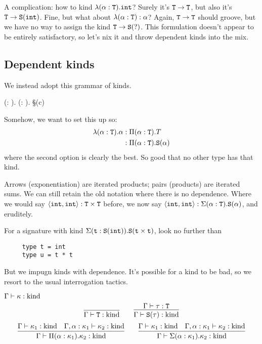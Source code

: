A complication: how to kind $\lambda(\alpha: \T). \int$? Surely it's $\T \to \T$,
but also it's $\T \to \S(\int)$. Fine, but what about $\lambda(\alpha : \T) : \alpha$?
Again, $\T \to \T$ should groove, but we have no way to assign the kind $\T \to \S(?)$.
This formulation doesn't appear to be entirely satisfactory, so let's nix it and throw
dependent kinds into the mix.

\subsection{Dependent kinds}
We instead adopt this grammar of kinds.
\begin{bnf}
  \kappa \bnfeq \T
  \alt \Pi (\alpha : \kappa). \kappa
  \alt \Sigma (\alpha : \kappa). \kappa
  \alt \S(c)
\end{bnf}

Somehow, we want to set this up so:
\begin{align*}
  \lambda(\alpha : \T) . \alpha &: \Pi(\alpha : \T) . T\\
                &: \Pi(\alpha : \T) . \S(\alpha)
\end{align*}
where the second option is clearly the best. So good that no other type has that kind.

Arrows (exponentiation) are iterated products; pairs (products) are iterated sums.
We can still retain the old notation where there is no dependence.
Where we would say $\langle \int, \int\rangle : \T\times\T$ before, we now say
\mbox{$\langle \int, \int \rangle : \Sigma(\alpha : \T). \S(\alpha)$}, and eruditely.

For a signature with kind $\Sigma(\texttt{t} : \S(\int)) . \S(\texttt{t} \times \texttt{t})$,
look no further than
\begin{verbatim}
     type t = int
     type u = t * t
\end{verbatim}

But we impugn kinds with dependence.
It's possible for a kind to be bad, so we resort to the usual
interrogation tactics.
\begin{judgment}
  $\Gamma \vdash \kappa : \kind$
  \[
    \infer{\Gamma \vdash \T : \kind}{}
    \qquad
    \infer{\Gamma \vdash \S(\tau) : \kind}
      {\Gamma \vdash \tau : \T}
  \]
  \[
    \infer{\Gamma \vdash \Pi(\alpha:\kappa_1).\kappa_2 : \kind}
      {\Gamma \vdash \kappa_1 : \kind
      &\Gamma, \alpha : \kappa_1 \vdash \kappa_2 : \kind
      }
    \qquad
    \infer{\Gamma \vdash \Sigma(\alpha:\kappa_1).\kappa_2 : \kind}
      {\Gamma \vdash \kappa_1 : \kind
      &\Gamma, \alpha : \kappa_1 \vdash \kappa_2 : \kind
      }
  \]
\end{judgment}

